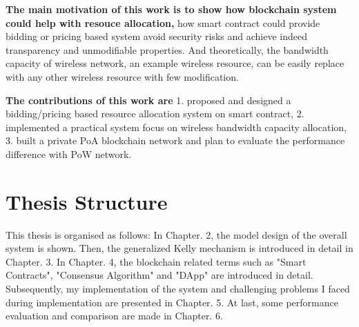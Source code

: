 \textbf{The main motivation of this work is to show how blockchain system could help with resouce allocation,} how  smart contract could provide bidding or pricing based system avoid security risks and achieve indeed transparency and unmodifiable properties. And theoretically, the bandwidth capacity of wireless network, an example wireless resource, can be easily replace with any other wireless resource with few modification. 

\textbf{The contributions of this work are} 1. proposed and designed a bidding/pricing based resource allocation system on smart contract, 2. implemented a practical system focus on wireless bandwidth capacity allocation, 3. built a private PoA blockchain network and plan to evaluate the performance difference with PoW network.

\section{Thesis Structure}

This thesis is organised as follows:
In Chapter. 2, the model design of the overall system is shown.
Then, the generalized Kelly mechanism is introduced in detail in Chapter. 3. 
In Chapter. 4, the blockchain related terms such as "Smart Contracts", "Consensus Algorithm" and "DApp" are introduced in detail. 
Subsequently, my implementation of the system and challenging problems I faced during implementation are presented in Chapter. 5. 
At last, some performance evaluation and comparison are made in Chapter. 6.

